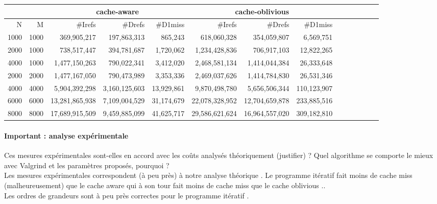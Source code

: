 \documentclass[10pt,a4paper]{article}
\begin{document}
\begin{tabular}{|r|r||r|r|r||r|r|r||r|r|r||r|r|r||}
  \hline
   \multicolumn{2}{|c||}{ }
   & \multicolumn{3}{c||}{cache-aware}
& \multicolumn{3}{c||}{cache-oblivious}
\\ \hline
N & M 

& \#Irefs & \#Drefs & \#D1miss %
& \#Irefs & \#Drefs & \#D1miss %
\\ \hline
\hline
1000 & 1000 
& 369,905,217 & 197,863,313 & 865,243  %
& 618,060,328 & 354,059,807 & 6,569,751  %
\\ \hline
2000 & 1000 

& 738,517,447 & 394,781,687 & 1,720,062  %
& 1,234,428,836 & 706,917,103  & 12,822,265   %
\\ \hline
4000 & 1000 
& 1,477,150,263 & 790,022,341  & 3,412,020   %
& 2,468,581,134 & 1,414,044,384 & 26,333,648   %
\\ \hline
2000 & 2000 
& 1,477,167,050 & 790,473,989 & 3,353,336   %
& 2,469,037,626 & 1,414,784,830 & 26,531,346  %
\\ \hline
4000 & 4000 

& 5,904,392,298 & 3,160,125,603  & 13,929,861 %
&  9,870,498,780 & 5,656,506,344 & 110,123,907  %
\\ \hline
6000 & 6000 

& 13,281,865,938 &  7,109,004,529 & 31,174,679  %
& 22,078,328,952 & 12,704,659,878  & 233,885,516  %
\\ \hline
8000 & 8000 

& 17,689,915,509 & 9,459,885,099 & 41,625,717  %
& 29,586,621,624 & 16,964,557,020 & 309,182,810  %
\\ \hline
\hline
\end{tabular}


\paragraph{Important : analyse expérimentale}
Ces mesures expérimentales sont-elles en accord avec les coûts analysés théoriquement (justifier) ? 
Quel algorithme se comporte le mieux avec Valgrind et les paramètres proposés, pourquoi ? \\
Les mesures expérimentales correspondent (à peu près) à notre analyse théorique . Le programme itératif fait moins de cache miss (malheureusement) que le cache
aware qui à son tour fait moins de cache miss que le cache oblivious .. \\
Les ordres de grandeurs sont à peu près correctes pour le programme itératif . \\  
\end{document}
